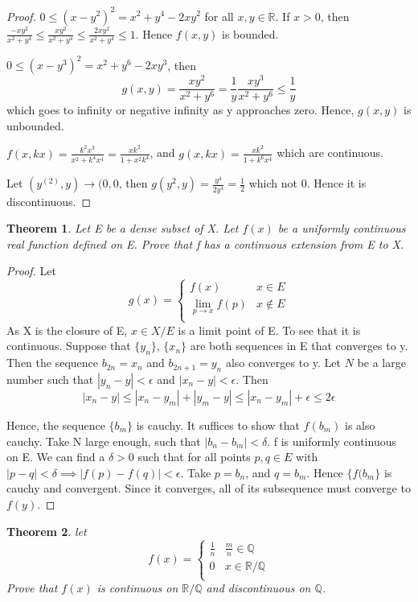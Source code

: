 \documentclass{article}
\theoremstyle{plain}
\newtheorem{theorem}{Theorem}
\theoremstyle{definition}
\begin{document}
\begin{proof}
	$ 0 \leq (x - y^{2})^{2} = x^2 + y^4 -2xy^2$ for all $x,y \in \mathbb{R}$. If $x > 0$, then $\frac{-xy^{2}}{x^{2} + y^{4}} \leq  \frac{xy^{2}}{x^{2} + y^{4}} \leq \frac{2xy^{2}}{x^{2} + y^{4}} \leq 1$. Hence $f(x,y)$ is bounded. 

	$0 \leq (x - y^{3})^{2} = x^{2} + y^{6} - 2xy^{3}$, then $$g(x,y) = \frac{xy^{2}}{x^{2} + y^{6}} = \frac{1}{y} \frac{xy^{3}}{x^{2} + y^{6}} \leq \frac{1}{y} $$ which goes to infinity or negative infinity as y approaches zero. Hence, $g(x,y)$ is unbounded.

	$f(x,kx) = \frac{k^{2}x^{3}}{x^{2} + k^{4}x^{4}} = \frac{xk^{2}}{1 + x^{2}k^{4}}$, and $g(x,kx) = \frac{xk^{2}}{1 + k^{6}x^{4}}$ which are continuous.

	Let $(y^(2),y) \to (0,0$, then $g(y^{2},y) = \frac{y^{4}}{2y^{4}} = \frac{1}{2}$ which not $0$. Hence it is discontinuous.
\end{proof}
 \begin{theorem}
	 Let E be a dense subset of X. Let $f(x)$ be a uniformly continuous real function defined on E. Prove that f has a continuous extension from E to X.
 \end{theorem}

 \begin{proof}
	 Let \[ g(x) = \begin{cases}
		 f(x) & x \in E \\
		 \lim_{p \to x} f(p) & x \not \in E \\
	 \end{cases}\] 
	 As X is the closure of E, $x \in X/E$ is a limit point of E. To see that it is continuous. Suppose that $\{y_{n}\}$, $\{x_{n} \} $ are both sequences in E that converges to y. Then the sequence $b_{2n} = x_{n}$ and $b_{2n + 1} = y_{n}$ also converges to y. Let $N$ be a large number such that $|y_{n} - y| < \epsilon$ and $|x_{n} - y| < \epsilon$. Then $$|x_{n} - y| \leq |x_{n} - y_{m}| + |y_{m} - y| \leq|x_{n} - y_{m}| + \epsilon \leq  2\epsilon $$ 

	Hence, the sequence $\{b_{m}\}$ is cauchy. It suffices to show that $f(b_{m})$ is also cauchy. Take N large enough, such that $|b_{n} - b_{m}| < \delta$. f is uniformly continuous on E. We can find a $\delta > 0$ such that for all points $p,q \in E$ with $|p - q| < \delta \implies |f(p) - f(q)| < \epsilon$. Take $p = b_{n}$, and $q = b_{m}$. Hence $\{f(b_{m}\}$ is cauchy and convergent. Since it converges, all of its subsequence must converge to $f(y)$.
 \end{proof}
 \begin{theorem}
	 let \[ f(x) = \begin{cases}
		 \frac{1}{n} & \frac{m}{n} \in \mathbb{Q}\\
		 0 & x \in \mathbb{R}/\mathbb{Q} \\
	 \end{cases}\] Prove that $f(x)$ is continuous on $\mathbb{R} /\mathbb{Q}$ and discontinuous on $\mathbb{Q}$.
 \end{theorem}
\end{document}
